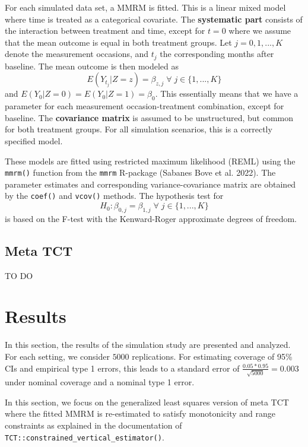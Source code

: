 \documentclass[
]{article}
\begin{document}
For each simulated data set, a MMRM is fitted. This is a linear mixed model
where time is treated as a categorical covariate. The \textbf{systematic part} consists
of the interaction between treatment and time, except for \(t = 0\) where we
assume that the mean outcome is equal in both treatment groups. Let \(j = 0, 1, ..., K\)
denote the measurement occasions, and \(t_j\) the corresponding months after baseline.
The mean outcome is then modeled as
\[E(Y_{t_j} | Z = z) = \beta_{z, j} \; \forall \; j \in \{ 1, ..., K \}\]
and \(E(Y_{0} | Z = 0) = E(Y_{0} | Z = 1) = \beta_0\).
This essentially
means that we have a parameter for each measurement occasion-treatment
combination, except for baseline. The \textbf{covariance matrix} is assumed to be
unstructured, but common for both treatment groups.
For all simulation scenarios, this is a correctly specified model.

These models are fitted using restricted maximum likelihood (REML) using the
\texttt{mmrm()} function from the \texttt{mmrm} R-package (Sabanes Bove et al. 2022). The parameter
estimates and corresponding variance-covariance matrix are obtained by the
\texttt{coef()} and \texttt{vcov()} methods. The hypothesis test for
\[H_0: \beta_{0, j} = \beta_{1, j} \; \forall \; j \in \{ 1, ..., K \} \]
is based on the F-test with the Kenward-Roger approximate degrees of freedom.

\hypertarget{meta-tct}{%
\subsection{Meta TCT}\label{meta-tct}}

TO DO

\hypertarget{results}{%
\section{Results}\label{results}}

In this section, the results of the simulation study are presented and analyzed.
For each setting, we consider \(5000\) replications. For estimating coverage of
95\% CIs and empirical type 1 errors, this leads to a standard error of
\(\frac{0.05*0.95}{\sqrt{5000}} = 0.003\) under nominal coverage and a nominal
type 1 error.

In this section, we focus on the generalized least squares version of meta TCT
where the fitted MMRM is re-estimated to satisfy monotonicity and range
constraints as explained in the documentation of
\texttt{TCT::constrained\_vertical\_estimator()}.
\end{document}

